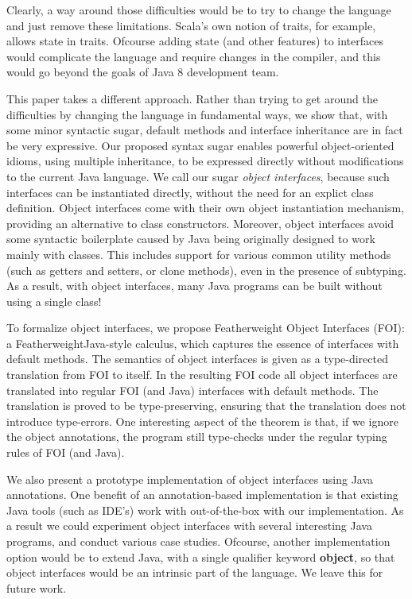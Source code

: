 \noindent Clearly, a way around those difficulties would be to try to
change the language and just remove these limitations. Scala's own
notion of traits, for example, allows state in traits. Ofcourse adding
state (and other features) to interfaces would complicate the language
and require changes in the compiler, and this would go beyond the
goals of Java 8 development team.

This paper takes a different approach. Rather than trying to get
around the difficulties by changing the language in fundamental ways,
we show that, with some minor syntactic sugar, default methods and
interface inheritance are in fact be very expressive. Our proposed
syntax sugar enables powerful object-oriented idioms, using multiple
inheritance, to be expressed directly without modifications to the
current Java language. We call our sugar \emph{object interfaces},
because such interfaces can be instantiated directly, without the need
for an explict class definition. Object interfaces come with their own
object instantiation mechanism, providing an alternative to class
constructors. Moreover, object interfaces avoid some syntactic
boilerplate caused by Java being originally designed to work mainly
with classes. This includes support for various common utility methods
(such as getters and setters, or clone methods), even in the presence
of subtyping. As a result, with object interfaces, many Java programs
can be built without using a single class!  

To formalize object interfaces, we propose Featherweight Object Interfaces (FOI): 
a FeatherweightJava-style calculus, which captures the essence 
of interfaces with default methods. The semantics of object interfaces 
is given as a type-directed translation from FOI to itself. 
In the resulting FOI code all object interfaces are translated into 
regular FOI (and Java) interfaces with default methods. The translation 
is proved to be type-preserving, ensuring that the translation does 
not introduce type-errors. One interesting aspect of the theorem is that, 
if we ignore the object annotations, the program still type-checks 
under the regular typing rules of FOI (and Java).

We also present a prototype implementation of object interfaces using
Java annotations. One benefit of an annotation-based implementation 
is that existing Java tools (such as IDE's) work with out-of-the-box
with our implementation. As a result we could experiment object
interfaces with several interesting Java programs, and conduct various
case studies.  Ofcourse, another implementation option would be to
extend Java, with a single qualifier keyword {\bf object}, so that
object interfaces would be an intrinsic part of the language. We leave
this for future work. 

